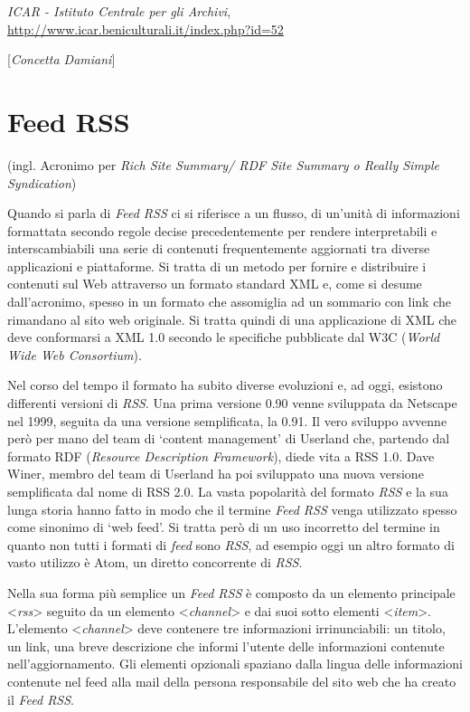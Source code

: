 {{\emph{ICAR - Istituto Centrale per gli Archivi},
\url{http://www.icar.beniculturali.it/index.php?id=52}
}

\hrulefill 

{[}\emph{Concetta Damiani}{]}



\chapter{Feed RSS}

(ingl. Acronimo per \emph{Rich Site Summary/ RDF Site Summary o Really
Simple Syndication})

Quando si parla di \emph{Feed RSS} ci si riferisce a un flusso, di
un'unità di informazioni formattata secondo regole decise
precedentemente per rendere interpretabili e interscambiabili una serie
di contenuti frequentemente aggiornati tra diverse applicazioni e
piattaforme. Si tratta di un metodo per fornire e distribuire i
contenuti sul Web attraverso un formato standard XML e, come si desume
dall'acronimo, spesso in un formato che assomiglia ad un sommario con
link che rimandano al sito web originale. Si tratta quindi di una
applicazione di XML che deve conformarsi a XML 1.0 secondo le specifiche
pubblicate dal W3C (\emph{World Wide Web Consortium}).

Nel corso del tempo il formato ha subito diverse evoluzioni e, ad oggi,
esistono differenti versioni di \emph{RSS}. Una prima versione 0.90
venne sviluppata da Netscape nel 1999, seguita da una versione
semplificata, la 0.91. Il vero sviluppo avvenne però per mano del team
di `content management' di Userland che, partendo dal formato RDF
(\emph{Resource Description Framework}), diede vita a RSS 1.0. Dave
Winer, membro del team di Userland ha poi sviluppato una nuova versione
semplificata dal nome di RSS 2.0. La vasta popolarità del formato
\emph{RSS} e la sua lunga storia hanno fatto in modo che il termine
\emph{Feed RSS} venga utilizzato spesso come sinonimo di `web feed'. Si
tratta però di un uso incorretto del termine in quanto non tutti i
formati di \emph{feed} sono \emph{RSS}, ad esempio oggi un altro formato
di vasto utilizzo è Atom, un diretto concorrente di \emph{RSS}.

Nella sua forma più semplice un \emph{Feed RSS} è composto da un
elemento principale \textless{}\emph{rss}\textgreater{} seguito da un
elemento \textless{}\emph{channel}\textgreater{} e dai suoi sotto
elementi \textless{}\emph{item}\textgreater{}. L'elemento
\textless{}\emph{channel}\textgreater{} deve contenere tre informazioni
irrinunciabili: un titolo, un link, una breve descrizione che informi
l'utente delle informazioni contenute nell'aggiornamento. Gli elementi
opzionali spaziano dalla lingua delle informazioni contenute nel feed
alla mail della persona responsabile del sito web che ha creato il
\emph{Feed RSS}.

}
